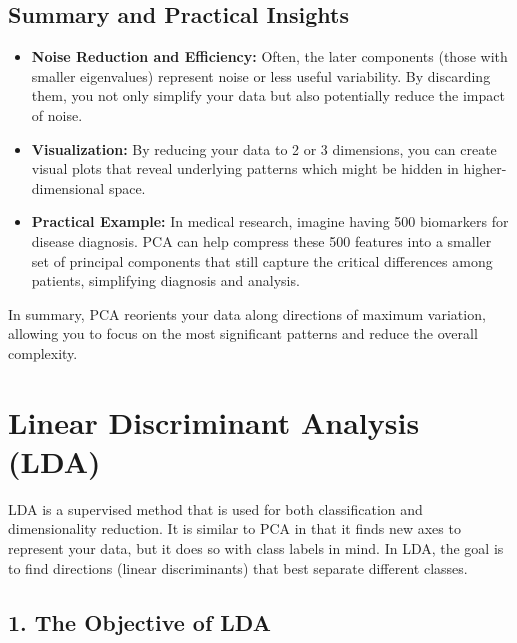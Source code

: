 \documentclass[10pt]{article}
\begin{document}
\subsection{Summary and Practical Insights}

\begin{itemize}
    \item \textbf{Noise Reduction and Efficiency:}  
    Often, the later components (those with smaller eigenvalues) represent noise or less useful variability. By discarding them, you not only simplify your data but also potentially reduce the impact of noise.
    
    \item \textbf{Visualization:}  
    By reducing your data to 2 or 3 dimensions, you can create visual plots that reveal underlying patterns which might be hidden in higher-dimensional space.

    \item \textbf{Practical Example:}  
    In medical research, imagine having 500 biomarkers for disease diagnosis. PCA can help compress these 500 features into a smaller set of principal components that still capture the critical differences among patients, simplifying diagnosis and analysis.
\end{itemize}

In summary, PCA reorients your data along directions of maximum variation, allowing you to focus on the most significant patterns and reduce the overall complexity.

\section{Linear Discriminant Analysis (LDA)}

LDA is a supervised method that is used for both classification and dimensionality reduction. It is similar to PCA in that it finds new axes to represent your data, but it does so with class labels in mind. In LDA, the goal is to find directions (linear discriminants) that best separate different classes.

\subsection*{1. The Objective of LDA}
\end{document}
